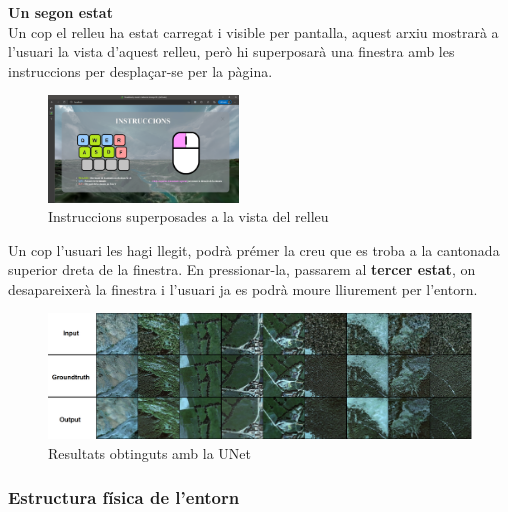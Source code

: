 ﻿\documentclass[10pt,a4paper,twocolumn,twoside]{article}
\begin{document}
\textbf{Un segon estat}\\
Un cop el relleu ha estat carregat i visible per pantalla, aquest arxiu mostrarà a l'usuari la vista d'aquest relleu, però hi superposarà una finestra amb les instruccions per desplaçar-se per la pàgina.
\begin{figure}[h]
\centering
\includegraphics[width=0.45\textwidth]{img/instruccions.png}
\caption{Instruccions superposades a la vista del relleu}
\end{figure}
Un cop l'usuari les hagi llegit, podrà prémer la creu que es troba a la cantonada superior dreta de la finestra. En pressionar-la, passarem al \textbf{tercer estat}, on desapareixerà la finestra i l'usuari ja es podrà moure lliurement per l'entorn.

\begin{figure}[t]
\centering
\includegraphics[width=1\textwidth]{img/comparacio.png}
\caption{Resultats obtinguts amb la UNet}
\label{fig:resultsUNet}
\end{figure}
\subsubsection{Estructura física de l'entorn}
\end{document}
